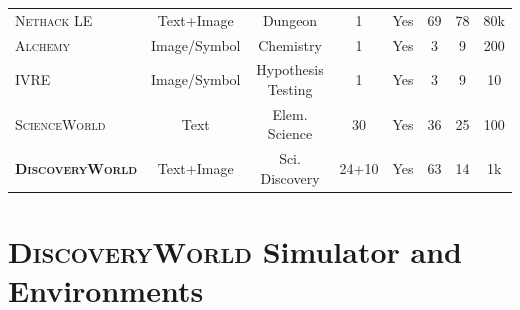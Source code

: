 \documentclass{article}
\newcommand{\env}{\textsc{DiscoveryWorld}\xspace}
\begin{document}
\begin{savenotes}
\begin{table}[t]
\begin{tabular}{lccccccc}
\rowcolor[HTML]{F3F3F3} 
\textsc{Nethack LE}~\citep{NetHack}     &   Text+Image   & Dungeon               &  1    & Yes   & 69     & 78    &   80k     \\
\textsc{Alchemy}~\citep{wang2021alchemy}        &   Image/Symbol           & Chemistry            &  1    & Yes     & 3     & 9     &   200       \\
\rowcolor[HTML]{F3F3F3} 
\textsc{IVRE}~\citep{xu2023interactive}           &   Image/Symbol           & Hypothesis Testing &  1    & Yes     & 3     & 9     &   10       \\
\textsc{ScienceWorld}~\citep{wang2022scienceworld}   &   Text        & Elem. Science         &  30   & Yes   & 36     & 25    &   100      \\
\rowcolor[HTML]{E3E3E3} 
\textbf{\env} &   Text+Image   & Sci. Discovery        &  24+10   & Yes   & 63     & 14    &   1k        \\
\bottomrule        
\end{tabular}
\end{table}
\end{savenotes}
 









\section{\env Simulator and Environments}
\end{document}
